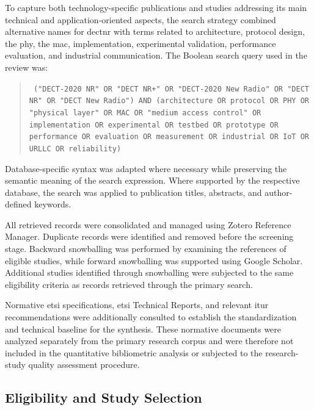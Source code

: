 To capture both technology-specific publications and studies addressing its
main technical and application-oriented aspects, the search strategy combined
alternative names for \gls{dectnr} with terms related to architecture,
protocol design, the \gls{phy}, the \gls{mac}, implementation, experimental
validation, performance evaluation, and industrial communication. The Boolean
search query used in the review was:

\begin{quote}
\small
\texttt{
("DECT-2020 NR" OR "DECT NR+" OR "DECT-2020 New Radio" OR
"DECT NR" OR "DECT New Radio") AND
(architecture OR protocol OR PHY OR "physical layer" OR MAC OR
"medium access control" OR implementation OR experimental OR
testbed OR prototype OR performance OR evaluation OR measurement OR
industrial OR IoT OR URLLC OR reliability)
}
\end{quote}

Database-specific syntax was adapted where necessary while preserving the
semantic meaning of the search expression. Where supported by the respective
database, the search was applied to publication titles, abstracts, and
author-defined keywords.

All retrieved records were consolidated and managed using Zotero Reference
Manager. Duplicate records were identified and removed before the screening
stage. Backward snowballing was performed by examining the references of
eligible studies, while forward snowballing was supported using Google
Scholar. Additional studies identified through snowballing were subjected to
the same eligibility criteria as records retrieved through the primary search.

Normative \gls{etsi} specifications, \gls{etsi} Technical Reports, and
relevant \gls{itur} recommendations were additionally consulted to establish
the standardization and technical baseline for the synthesis. These normative
documents were analyzed separately from the primary research corpus and were
therefore not included in the quantitative bibliometric analysis or subjected
to the research-study quality assessment procedure.

\subsection{Eligibility and Study Selection}
\label{subsec:eligibility}

